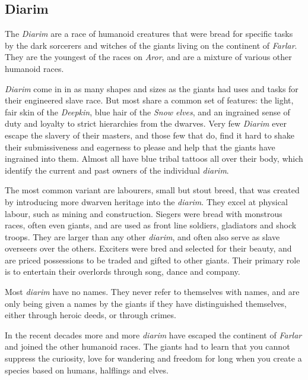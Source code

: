 \subsection*{Diarim}


The \emph{Diarim} are a race of humanoid creatures that were bread for
specific tasks by the dark sorcerers and witches of the giants living on the
continent of \emph{Farlar}. They are the youngest of the races on \emph{Aror},
and are a mixture of various other humanoid races.

\emph{Diarim} come in in as many shapes and sizes as the giants had uses and
tasks for their engineered slave race. But most share a common set of features:
the light, fair skin of the \emph{Deepkin}, blue hair of the \emph{Snow elves},
and an ingrained sense of duty and loyalty to strict hierarchies from the
dwarves. Very few \emph{Diarim} ever escape the slavery of their masters, and
those few that do, find it hard to shake their submissiveness and eagerness to
please and help that the giants have ingrained into them. Almost all have blue
tribal tattoos all over their body, which identify the current and past owners
of the individual \emph{diarim}.

The most common variant are labourers, small but stout breed, that was created
by introducing more dwarven heritage into the \emph{diarim}. They excel at
physical labour, such as mining and construction. Siegers were bread with
monstrous races, often even giants, and are used as front line soldiers,
gladiators and shock troops. They are larger than any other \emph{diarim}, and
often also serve as slave overseers over the others. Exciters were bred and
selected for their beauty, and are priced possessions to be traded and gifted
to other giants. Their primary role is to entertain their overlords through
song, dance and company.

Most \emph{diarim} have no names. They never refer to themselves with names,
and are only being given a names by the giants if they have distinguished
themselves, either through heroic deeds, or through crimes.

In the recent decades more and more \emph{diarim} have escaped the continent
of \emph{Farlar} and joined the other humanoid races. The giants had to learn
that you cannot suppress the curiosity, love for wandering and freedom for long
when you create a species based on humans, halflings and elves.

